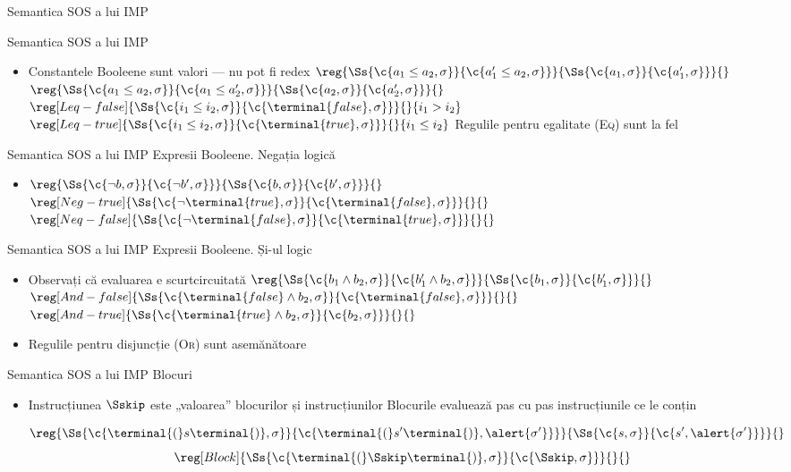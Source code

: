 \documentclass[xcolor=pdftex,romanian,colorlinks]{beamer}
\begin{document}
\begin{section}{Semantica SOS a lui IMP}
\begin{frame}{Semantica SOS a lui IMP}
  \begin{itemize}
  \item Constantele Booleene sunt valori --- nu pot fi redex
  \vitem[] $\reg{\Ss{\c{a_1 \leq a_2,\sigma}}{\c{a_1' \leq a_2,\sigma}}}{\Ss{\c{a_1,\sigma}}{\c{a_1',\sigma}}}{}$\hfill$\reg{\Ss{\c{a_1 \leq a_2,\sigma}}{\c{a_1 \leq a_2',\sigma}}}{\Ss{\c{a_2,\sigma}}{\c{a_2',\sigma}}}{}$
  \vitem[] $\reg[Leq-false]{\Ss{\c{i_1 \leq i_2,\sigma}}{\c{\terminal{false},\sigma}}}{}{i_1 > i_2}$
  \vitem[] $\reg[Leq-true]{\Ss{\c{i_1 \leq i_2,\sigma}}{\c{\terminal{true},\sigma}}}{}{i_1 \leq i_2}$
  \vitem Regulile pentru egalitate (\textsc{Eq}) sunt la fel

  \end{itemize}
  \end{frame}
  \begin{frame}{Semantica SOS a lui IMP}
  {Expresii Booleene. Negația logică}
  \begin{itemize}
  \item[] $\reg{\Ss{\c{\neg b,\sigma}}{\c{\neg b',\sigma}}}{\Ss{\c{b,\sigma}}{\c{b',\sigma}}}{}$
  \vitem[] $\reg[Neg-true]{\Ss{\c{\neg \terminal{true},\sigma}}{\c{\terminal{false},\sigma}}}{}{}$
  \vitem[] $\reg[Neq-false]{\Ss{\c{\neg \terminal{false},\sigma}}{\c{\terminal{true},\sigma}}}{}{}$
  \end{itemize}
  \end{frame}
  \begin{frame}{Semantica SOS a lui IMP}
  {Expresii Booleene. Și-ul logic}
  \begin{itemize}
  \item Observați că evaluarea e scurtcircuitată
  \vitem[] $\reg{\Ss{\c{b_1 \wedge b_2,\sigma}}{\c{b_1' \wedge b_2,\sigma}}}{\Ss{\c{b_1,\sigma}}{\c{b_1',\sigma}}}{}$
  \vitem[] $\reg[And-false]{\Ss{\c{{\terminal{false}} \wedge b_2,\sigma}}{\c{\terminal{false},\sigma}}}{}{}$
  \vitem[] $\reg[And-true]{\Ss{\c{{\terminal{true}} \wedge b_2,\sigma}}{\c{b_2,\sigma}}}{}{}$
  \item Regulile pentru disjuncție (\textsc{Or}) sunt asemănătoare
  \end{itemize}
  \end{frame}
  \begin{frame}{Semantica SOS a lui IMP}
  {Blocuri}
  \begin{itemize}
  \item Instrucțiunea $\Sskip$ este „valoarea” blocurilor și instrucțiunilor
  \vitem Blocurile evaluează pas cu pas instrucțiunile ce le conțin

  \[\reg{\Ss{\c{\terminal{(} s \terminal{)},\sigma}}{\c{\terminal{(} s' \terminal{)},\alert{\sigma'}}}}{\Ss{\c{s,\sigma}}{\c{s',\alert{\sigma'}}}}{}\]
  \vitem[] \[\reg[Block]{\Ss{\c{\terminal{(} \Sskip \terminal{)},\sigma}}{\c{\Sskip,\sigma}}}{}{}\]
  \end{itemize}
  \end{frame}


\end{section}
\end{document}

